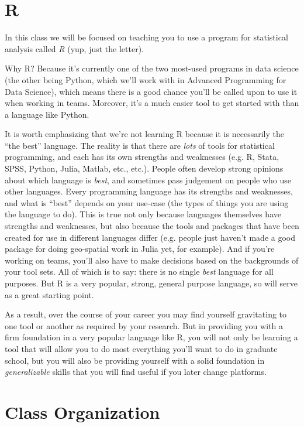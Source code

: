 \documentclass[12pt]{article}
\begin{document}
\section{R}

In this class we will be focused on teaching you to use a program for statistical analysis called \emph{R} (yup, just the letter).

Why R? Because it's currently one of the two most-used programs in data science (the other being Python, which we'll work with in Advanced Programming for Data Science), which means there is a good chance you'll be called upon to use it when working in teams. Moreover, it's a much easier tool to get started with than a language like Python.

It is worth emphasizing that we're not learning R because it is necessarily the ``the best'' language. The reality is that there are \emph{lots} of tools for statistical programming, and each has its own strengths and weaknesses (e.g. R, Stata, SPSS, Python, Julia, Matlab, etc., etc.). People often develop strong opinions about which language is \emph{best}, and sometimes pass judgement on people who use other languages. Every programming language has its strengths and weaknesses, and what is ``best'' depends on your use-case (the types of things you are using the language to do). This is true not only because languages themselves have strengths and weaknesses, but also because the tools and packages that have been created for use in different languages differ (e.g. people just haven't made a good package for doing geo-spatial work in Julia yet, for example). And if you're working on teams, you'll also have to make decisions based on the backgrounds of your tool sets. All of which is to say: there is no single \emph{best} language for all purposes. But R is a very popular, strong, general purpose language, so will serve as a great starting point.

As a result, over the course of your career you may find yourself gravitating to one tool or another as required by your research. But in providing you with a firm foundation in a very popular language like R, you will not only be learning a tool that will allow you to do most everything you'll want to do in graduate school, but you will also be providing yourself with a solid foundation in \emph{generalizable} skills that you will find useful if you later change platforms.

\section{Class Organization}
\end{document}
